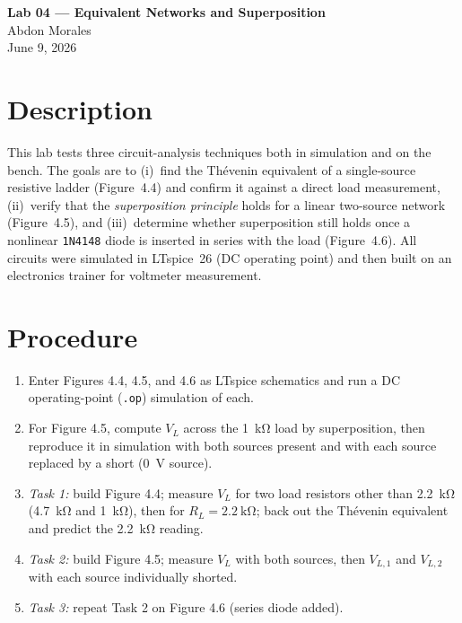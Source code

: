 \documentclass[11pt]{article}
\begin{document}
\begin{center}
    {\LARGE\bfseries Lab 04 --- Equivalent Networks and Superposition}\\[0.8em]
    {\large Abdon Morales}\\[0.3em]
    {\large June 9, 2026}
\end{center}
\vspace{1em}

\section*{Description}

This lab tests three circuit-analysis techniques both in simulation and on the
bench. The goals are to (i)~find the Th\'evenin equivalent of a single-source
resistive ladder (Figure~4.4) and confirm it against a direct load measurement,
(ii)~verify that the \emph{superposition principle} holds for a linear two-source
network (Figure~4.5), and (iii)~determine whether superposition still holds once a
nonlinear \texttt{1N4148} diode is inserted in series with the load (Figure~4.6).
All circuits were simulated in LTspice~26 (DC operating point) and then built on
an electronics trainer for voltmeter measurement.

\section*{Procedure}

\begin{enumerate}
    \item Enter Figures 4.4, 4.5, and 4.6 as LTspice schematics and run a DC
          operating-point (\texttt{.op}) simulation of each.
    \item For Figure 4.5, compute $V_L$ across the \SI{1}{\kilo\ohm} load by
          superposition, then reproduce it in simulation with both sources
          present and with each source replaced by a short (\SI{0}{\volt} source).
    \item \emph{Task 1:} build Figure 4.4; measure $V_L$ for two load resistors
          other than \SI{2.2}{\kilo\ohm} (\SI{4.7}{\kilo\ohm} and
          \SI{1}{\kilo\ohm}), then for $R_L=\SI{2.2}{\kilo\ohm}$; back out the
          Th\'evenin equivalent and predict the \SI{2.2}{\kilo\ohm} reading.
    \item \emph{Task 2:} build Figure 4.5; measure $V_L$ with both sources, then
          $V_{L,1}$ and $V_{L,2}$ with each source individually shorted.
    \item \emph{Task 3:} repeat Task 2 on Figure 4.6 (series diode added).
\end{enumerate}
\end{document}
